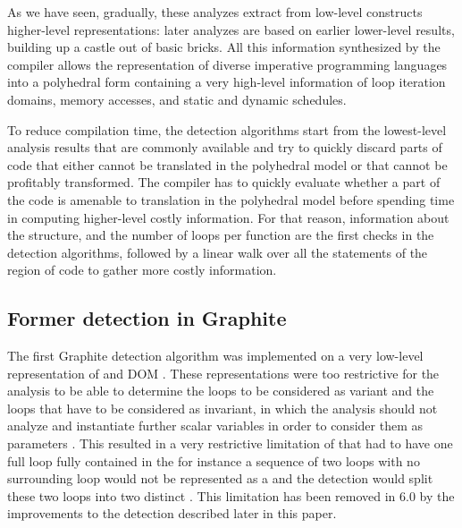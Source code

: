 \documentclass{sig-alternate}
\begin{document}
As we have seen, gradually, these analyzes extract from low-level constructs
higher-level representations: later analyzes are based on earlier lower-level
results, building up a castle out of basic bricks.  All this information
synthesized by the compiler allows the representation of diverse imperative
programming languages into a polyhedral form \cite{Girbal} containing a very
high-level information of loop iteration domains, memory accesses, and static
and dynamic schedules.

To reduce compilation time, the \SCoP{} detection algorithms start from the
lowest-level analysis results that are commonly available and try to quickly
discard parts of code that either cannot be translated in the polyhedral model
or that cannot be profitably transformed.  The compiler has to quickly evaluate
whether a part of the code is amenable to translation in the polyhedral model
before spending time in computing higher-level costly information.  For that
reason, information about the \CFG{} structure, and the number of loops per
function are the first checks in the \SCoP{} detection algorithms, followed by a
linear walk over all the statements of the region of code to gather more costly
information.

\subsection{Former \SCoP{} detection in Graphite}
\label{subsec:graphite-SCoP}
The first Graphite \SCoP{} detection algorithm was implemented on a very low-level
representation of \CFG{} and DOM \cite{graphite}.  These representations were too
restrictive for the \scev{} analysis to be able to determine the loops to be
considered as variant and the loops that have to be considered as invariant, in
which the \scev{} analysis should not analyze and instantiate further scalar
variables in order to consider them as parameters \cite{scev}.  This resulted in
a very restrictive limitation of  that had to have one full loop fully
contained in the \SCoP{:} for instance a sequence of two loops with no surrounding
loop would not be represented as a \SCoP{} and the \SCoP{} detection would split these
two loops into two distinct .  This limitation has been removed in \GCC{} 6.0
by the improvements to the \SCoP{} detection described later in this paper.
\end{document}
